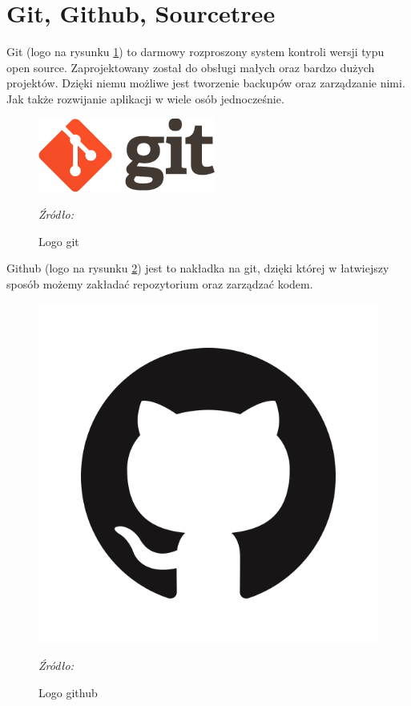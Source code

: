 \documentclass[12pt,oneside]{report}
\begin{document}
\section{Git, Github, Sourcetree}
Git (logo na rysunku \ref{GitLogo}) to darmowy rozproszony system kontroli wersji typu open source. Zaprojektowany został do obsługi małych oraz bardzo dużych projektów. Dzięki niemu możliwe jest tworzenie backupów oraz zarządzanie nimi. Jak także rozwijanie aplikacji w wiele osób jednocześnie.\cite{git}
\begin{figure}[H]
	\centering
	\includegraphics[scale=0.6]{git}
	\caption{Logo git}
	\textit{Źródło: \cite{git}}
	\label{GitLogo}
\end{figure}
Github (logo na rysunku \ref{GithubLogo}) jest to nakładka na git, dzięki której w łatwiejszy sposób możemy zakładać repozytorium oraz zarządzać kodem.\cite{github}
\begin{figure}[H]
	\centering
	\includegraphics[scale=0.3]{githubLogo}
	\caption{Logo github}
	\textit{Źródło: \cite{github}}
	\label{GithubLogo}
\end{figure}
\end{document}
